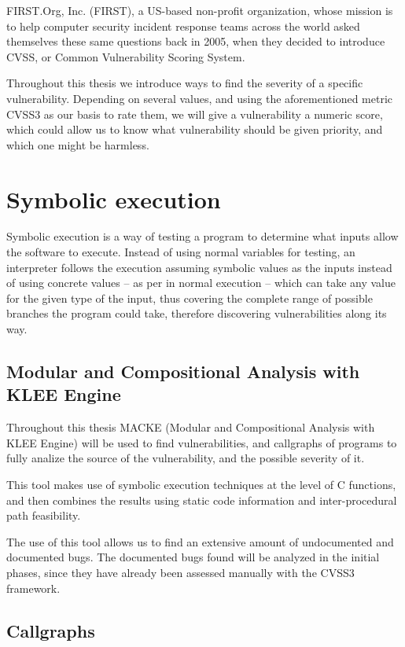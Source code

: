 FIRST.Org, Inc. (FIRST), a US-based non-profit organization, whose mission is to help computer security incident response teams across the world\parencite{cvss3} asked themselves these same questions back in 2005, when they decided to introduce CVSS, or Common Vulnerability Scoring System\parencite{cvss3}.

Throughout this thesis we introduce ways to find the severity of a specific vulnerability. Depending on several values, and using the aforementioned metric CVSS3 as our basis to rate them, we will give a vulnerability a numeric score, which could allow us to know what vulnerability should be given priority, and which one might be harmless.

\section{Symbolic execution}

Symbolic execution is a way of testing a program to determine what inputs allow the software to execute. Instead of using normal variables for testing, an interpreter follows the execution assuming symbolic values as the inputs instead of using concrete values -- as per in normal execution -- which can take any value for the given type of the input, thus covering the complete range of possible branches the program could take, therefore discovering vulnerabilities along its way.


\subsection{Modular and Compositional Analysis with KLEE Engine}

Throughout this thesis MACKE (Modular and Compositional Analysis with KLEE Engine)\parencite{ognawala} will be used to find vulnerabilities, and callgraphs of programs to fully analize the source of the vulnerability, and the possible severity of it.

This tool makes use of symbolic execution techniques at the level of C functions, and then combines the results using static code information and inter-procedural path feasibility\parencite{ognawala}.

The use of this tool allows us to find an extensive amount of undocumented and documented bugs. The documented bugs found will be analyzed in the initial phases, since they have already been assessed manually with the CVSS3 framework.

\subsection{Callgraphs}

